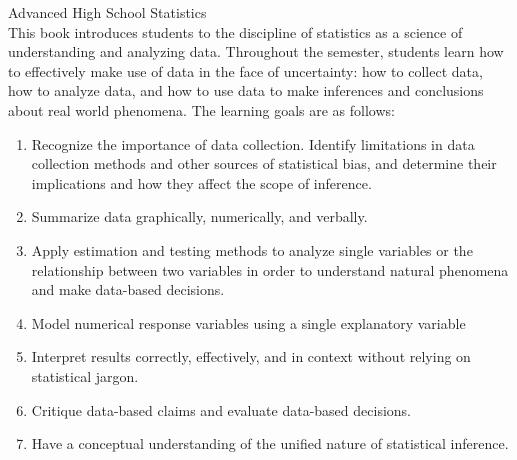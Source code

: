 \documentclass[11pt]{article}
\begin{document}
{\LARGE \textcolor{oiB}{Advanced High School Statistics}} \\


This book introduces students to the discipline of statistics as a science of understanding and analyzing data. Throughout the semester, students learn how to effectively make use of data in the face of uncertainty: how to collect data, how to analyze data, and how to use data to make inferences and conclusions about real world phenomena. The learning goals are as follows:
 
\begin{enumerate}
\renewcommand\labelenumi{\textcolor{oiB}{\textbf{Goal \theenumi.}}}
\item Recognize the importance of data collection.  Identify limitations in data collection methods and other sources of statistical bias, and determine their implications and how they affect the scope of inference.
\item Summarize data graphically, numerically, and verbally.  
\item Apply estimation and testing methods to analyze single variables or the relationship between two variables in order to understand natural phenomena and make data-based decisions.
\item Model numerical response variables using a single explanatory variable 
\item Interpret results correctly, effectively, and in context without relying on statistical jargon.
\item Critique data-based claims and evaluate data-based decisions.
\item Have a conceptual understanding of the unified nature of statistical inference.
\end{enumerate}
\end{document}
